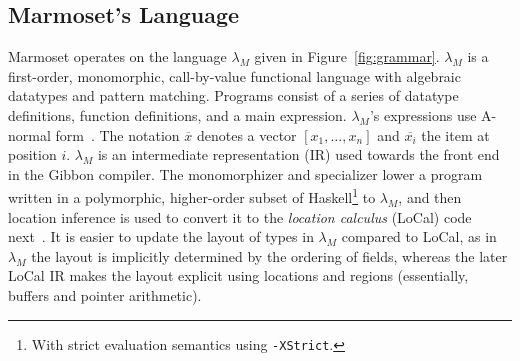 \documentclass[acmsmall,review,anonymous]{acmart}\settopmatter{printfolios=true,printccs=false,printacmref=false}
\newcommand{\figref}[1]{Figure~\ref{#1}\xspace}
\newcommand{\il}[1]{\lstinline[style=inline,mathescape=true];#1;}
\newcommand{\system}{{\sc Marmoset}\xspace}
\newcommand{\systemlang}[0]{\ensuremath{\lambda_{M}}}
\newcommand{\keywd}[1]{\mathit{#1}}
\newcommand{\ind}{\keywd{i}}
\newcommand{\vectorize}[1]{\overline{#1}}
\begin{document}
\subsection{\system's Language}
\system{} operates on the language \systemlang{} given in \figref{fig:grammar}.
\systemlang{} is a first-order, monomorphic, call-by-value functional language
with algebraic datatypes and pattern matching.
Programs consist of a series of datatype definitions, function definitions, and a main expression.
\systemlang{}'s expressions use A-normal form~\cite{ANF}.
The notation $\vectorize{x}$ denotes a vector $ [x_1, \ldots, x_n] $ and $\vectorize{x_{\ind}}$
the item at position $\ind$.
\systemlang{} is an intermediate representation (IR) used towards the front end in the Gibbon compiler.
The monomorphizer and specializer lower a program written in a polymorphic, higher-order subset of Haskell\footnote{With strict evaluation semantics using \il{-XStrict}.} to \systemlang{},
and then location inference is used to convert it to the {\em location calculus} (LoCal) code next~\cite{Local}.
It is easier to update the layout of types in \systemlang{} compared to LoCal,
as in \systemlang{} the layout is implicitly determined by the ordering of fields,
whereas the later LoCal IR makes the layout explicit using locations and regions (essentially, buffers and pointer arithmetic).











	
\end{document}
